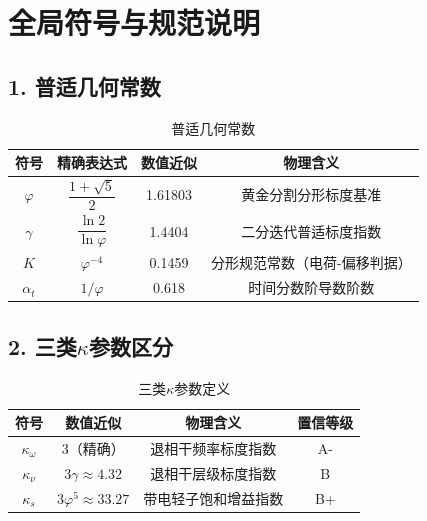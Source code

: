 \documentclass[12pt,a4paper,twocolumn]{article}
\renewcommand{\phi}{\varphi}
\begin{document}
\twocolumn[{
\begin{@twocolumnfalse}
\tableofcontents
\vspace{1em}
\end{@twocolumnfalse}
}]

\section*{全局符号与规范说明}

\subsection*{1. 普适几何常数}
\begin{table}[H]
\centering
\footnotesize
\caption{普适几何常数}
\begin{tabular}{c|c|c|c}
\hline
\textbf{符号} & \textbf{精确表达式} & \textbf{数值近似} & \textbf{物理含义} \\
\hline
$\phi$ & $\dfrac{1+\sqrt{5}}{2}$ & 1.61803 & 黄金分割分形标度基准 \\
$\gamma$ & $\dfrac{\ln 2}{\ln \phi}$ & 1.4404 & 二分迭代普适标度指数 \\
$K$ & $\phi^{-4}$ & 0.1459 & 分形规范常数（电荷-偏移判据） \\
$\alpha_t$ & $1/\phi$ & 0.618 & 时间分数阶导数阶数 \\
\hline
\end{tabular}
\end{table}

\subsection*{2. 三类$\kappa$参数区分}
\begin{table}[H]
\centering
\footnotesize
\caption{三类$\kappa$参数定义}
\begin{tabular}{c|c|c|c}
\hline
\textbf{符号} & \textbf{数值近似} & \textbf{物理含义} & \textbf{置信等级} \\
\hline
$\kappa_\omega$ & 3（精确） & 退相干频率标度指数 & A- \\
$\kappa_\nu$ & $3\gamma \approx 4.32$ & 退相干层级标度指数 & B \\
$\kappa_s$ & $3\phi^5 \approx 33.27$ & 带电轻子饱和增益指数 & B+ \\
\hline
\end{tabular}
\end{table}
\end{document}
